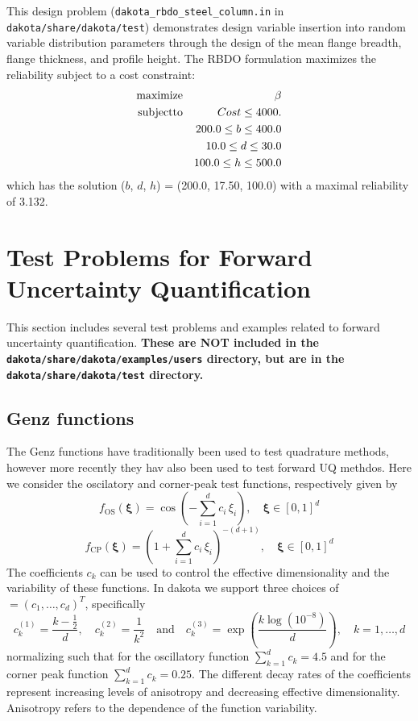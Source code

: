 This design problem (\texttt{dakota\_rbdo\_steel\_column.in} in
\texttt{dakota/share/dakota/test}) demonstrates design variable insertion into
random variable distribution parameters through the design of the mean
flange breadth, flange thickness, and profile height. The RBDO
formulation maximizes the reliability subject to a cost constraint:
\begin{eqnarray}
{\rm maximize }   & & \beta                   \nonumber \\
{\rm subject to } & & Cost  \leq 4000.       \nonumber \\
                  & & 200.0 \leq b \leq 400.0 \\
                  & &  10.0 \leq d \leq  30.0 \nonumber \\
                  & & 100.0 \leq h \leq 500.0 \nonumber
\end{eqnarray}
which has the solution ($b$, $d$, $h$) = (200.0, 17.50, 100.0) with a
maximal reliability of 3.132.

\section{Test Problems for Forward Uncertainty Quantification}\label{additional:fwd_uq}
This section includes several test problems and examples related to
forward uncertainty quantification. {\bf These are NOT included in the
  {\tt dakota/share/dakota/examples/users} directory, but are in the {\tt
    dakota/share/dakota/test} directory.}

\subsection{Genz functions}
The Genz functions have traditionally been used to test quadrature
methods, however more recently they hav also been used to test forward
UQ methdos. Here we consider the oscilatory and corner-peak test
functions, respectively given by
\[
 f_{\mathrm{OS}}(\boldsymbol{\xi})=\cos\left(-\sum_{i=1}^d c_i\, \xi_i \right),\quad \boldsymbol{\xi}\in[0,1]^d
\]
\[
 f_{\mathrm{CP}}(\boldsymbol{\xi})=\left(1+\sum_{i=1}^d c_i\, \xi_i \right)^{-(d+1)},\quad \boldsymbol{\xi}\in[0,1]^d
\]
The coefficients $c_k$ can be used to control the effective dimensionality
and the variability of these functions. In dakota we support three
choices of $\boldsymbol = (c_1,\ldots,c_d)^T$, specifically
\[
c^{(1)}_k=\frac{k-\frac{1}{2}}{d},\quad c_k^{(2)}=\frac{1}{k^2}\quad \text{and}
\quad c_k^{(3)} = \exp\left(\frac{k\log(10^{-8})}{d}\right), \quad k=1,\ldots,d
\]
normalizing such that for the oscillatory function $\sum_{k=1}^d c_k =
4.5$ and for the corner peak function $\sum_{k=1}^d c_k = 0.25$. The
different decay rates of the coefficients represent increasing levels
of anisotropy and decreasing effective dimensionality. Anisotropy
refers to the dependence of the function variability.

